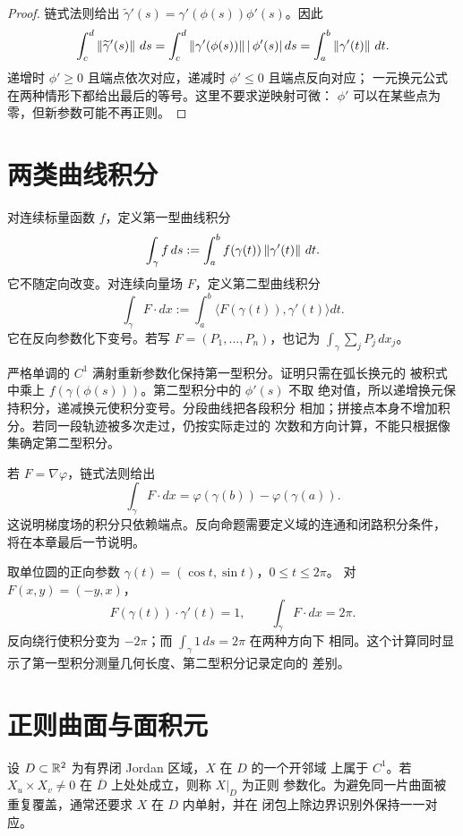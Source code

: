 \begin{proof}
链式法则给出
$\widetilde\gamma'(s)=\gamma'(\phi(s))\phi'(s)$。因此
\[
 \int_c^d\left\lVert\widetilde\gamma'(s)\right\rVert\,ds
 =\int_c^d\left\lVert\gamma'(\phi(s))\right\rVert|\,\phi'(s)|\,ds
 =\int_a^b\left\lVert\gamma'(t)\right\rVert\,dt.
\]
递增时 $\phi'\ge0$ 且端点依次对应，递减时 $\phi'\le0$ 且端点反向对应；
一元换元公式在两种情形下都给出最后的等号。这里不要求逆映射可微：
$\phi'$ 可以在某些点为零，但新参数可能不再正则。
\end{proof}

\section{两类曲线积分}

对连续标量函数 $f$，定义第一型曲线积分
\[
 \int_\gamma f\,ds
 :=\int_a^bf(\gamma(t))\left\lVert\gamma'(t)\right\rVert\,dt.
\]
它不随定向改变。对连续向量场 $F$，定义第二型曲线积分
\[
 \int_\gamma F\cdot d x
 :=\int_a^b\langle F(\gamma(t)),\gamma'(t)\rangle dt.
\]
它在反向参数化下变号。若写 $F=(P_1,\ldots,P_n)$，也记为
$\int_\gamma\sum_jP_j\,dx_j$。

严格单调的 $C^1$ 满射重新参数化保持第一型积分。证明只需在弧长换元的
被积式中乘上 $f(\gamma(\phi(s)))$。第二型积分中的 $\phi'(s)$ 不取
绝对值，所以递增换元保持积分，递减换元使积分变号。分段曲线把各段积分
相加；拼接点本身不增加积分。若同一段轨迹被多次走过，仍按实际走过的
次数和方向计算，不能只根据像集确定第二型积分。

若 $F=\nabla\varphi$，链式法则给出
\[
 \int_\gamma F\cdot dx
 =\varphi(\gamma(b))-\varphi(\gamma(a)).
\]
这说明梯度场的积分只依赖端点。反向命题需要定义域的连通和闭路积分条件，
将在本章最后一节说明。

\begin{example}
取单位圆的正向参数 $\gamma(t)=(\cos t,\sin t)$，$0\le t\le2\pi$。
对 $F(x,y)=(-y,x)$，
\[
 F(\gamma(t))\cdot\gamma'(t)=1,
 \qquad \int_\gamma F\cdot dx=2\pi.
\]
反向绕行使积分变为 $-2\pi$；而 $\int_\gamma1\,ds=2\pi$ 在两种方向下
相同。这个计算同时显示了第一型积分测量几何长度、第二型积分记录定向的
差别。
\end{example}

\section{正则曲面与面积元}

设 $D\subset\mathbb{R}^2$ 为有界闭 Jordan 区域，$X$ 在 $D$ 的一个开邻域
上属于 $C^1$。若
$X_u\times X_v\ne0$ 在 $\overline D$ 上处处成立，则称 $X|_D$ 为正则
参数化。为避免同一片曲面被重复覆盖，通常还要求 $X$ 在 $D$ 内单射，并在
闭包上除边界识别外保持一一对应。

